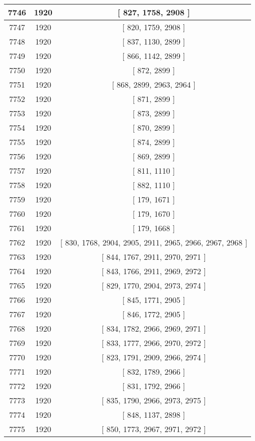 \begin{center}
\begin{longtable}[H]{|| c c c ||}
\hline
7746 & 1920 & [ 827, 1758, 2908 ] \\ 
\hline
7747 & 1920 & [ 820, 1759, 2908 ] \\ 
\hline
7748 & 1920 & [ 837, 1130, 2899 ] \\ 
\hline
7749 & 1920 & [ 866, 1142, 2899 ] \\ 
\hline
7750 & 1920 & [ 872, 2899 ] \\ 
\hline
7751 & 1920 & [ 868, 2899, 2963, 2964 ] \\ 
\hline
7752 & 1920 & [ 871, 2899 ] \\ 
\hline
7753 & 1920 & [ 873, 2899 ] \\ 
\hline
7754 & 1920 & [ 870, 2899 ] \\ 
\hline
7755 & 1920 & [ 874, 2899 ] \\ 
\hline
7756 & 1920 & [ 869, 2899 ] \\ 
\hline
7757 & 1920 & [ 811, 1110 ] \\ 
\hline
7758 & 1920 & [ 882, 1110 ] \\ 
\hline
7759 & 1920 & [ 179, 1671 ] \\ 
\hline
7760 & 1920 & [ 179, 1670 ] \\ 
\hline
7761 & 1920 & [ 179, 1668 ] \\ 
\hline
7762 & 1920 & [ 830, 1768, 2904, 2905, 2911, 2965, 2966, 2967, 2968 ] \\ 
\hline
7763 & 1920 & [ 844, 1767, 2911, 2970, 2971 ] \\ 
\hline
7764 & 1920 & [ 843, 1766, 2911, 2969, 2972 ] \\ 
\hline
7765 & 1920 & [ 829, 1770, 2904, 2973, 2974 ] \\ 
\hline
7766 & 1920 & [ 845, 1771, 2905 ] \\ 
\hline
7767 & 1920 & [ 846, 1772, 2905 ] \\ 
\hline
7768 & 1920 & [ 834, 1782, 2966, 2969, 2971 ] \\ 
\hline
7769 & 1920 & [ 833, 1777, 2966, 2970, 2972 ] \\ 
\hline
7770 & 1920 & [ 823, 1791, 2909, 2966, 2974 ] \\ 
\hline
7771 & 1920 & [ 832, 1789, 2966 ] \\ 
\hline
7772 & 1920 & [ 831, 1792, 2966 ] \\ 
\hline
7773 & 1920 & [ 835, 1790, 2966, 2973, 2975 ] \\ 
\hline
7774 & 1920 & [ 848, 1137, 2898 ] \\ 
\hline
7775 & 1920 & [ 850, 1773, 2967, 2971, 2972 ] \\ 

\end{longtable}
\end{center}
